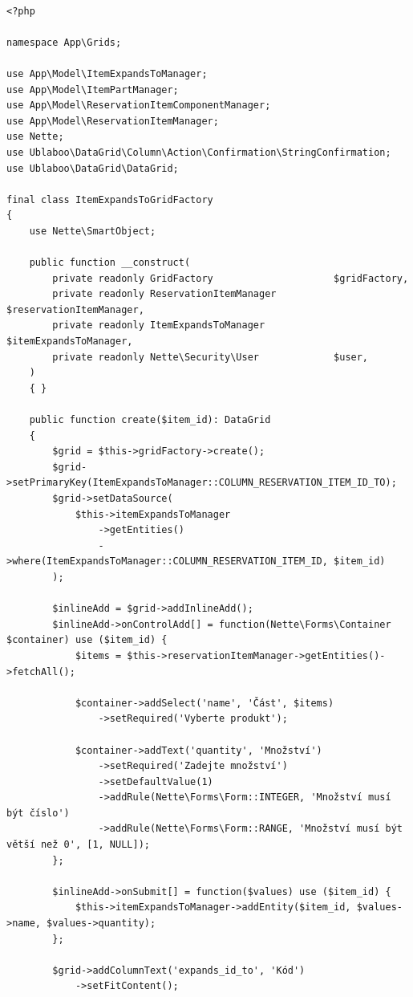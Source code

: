 \begin{lstlisting}[label=src:GenerateStockTakingDocumentFormFactory,caption={Továrna editovatelné tabulky pro správu vazeb produktů}]

<?php

namespace App\Grids;

use App\Model\ItemExpandsToManager;
use App\Model\ItemPartManager;
use App\Model\ReservationItemComponentManager;
use App\Model\ReservationItemManager;
use Nette;
use Ublaboo\DataGrid\Column\Action\Confirmation\StringConfirmation;
use Ublaboo\DataGrid\DataGrid;

final class ItemExpandsToGridFactory
{
    use Nette\SmartObject;

    public function __construct(
        private readonly GridFactory                     $gridFactory,
        private readonly ReservationItemManager          $reservationItemManager,
        private readonly ItemExpandsToManager            $itemExpandsToManager,
        private readonly Nette\Security\User             $user,
    )
    { }

    public function create($item_id): DataGrid
    {
        $grid = $this->gridFactory->create();
        $grid->setPrimaryKey(ItemExpandsToManager::COLUMN_RESERVATION_ITEM_ID_TO);
        $grid->setDataSource(
            $this->itemExpandsToManager
                ->getEntities()
                ->where(ItemExpandsToManager::COLUMN_RESERVATION_ITEM_ID, $item_id)
        );

        $inlineAdd = $grid->addInlineAdd();
        $inlineAdd->onControlAdd[] = function(Nette\Forms\Container $container) use ($item_id) {
            $items = $this->reservationItemManager->getEntities()->fetchAll();
            
            $container->addSelect('name', 'Část', $items)
                ->setRequired('Vyberte produkt');

            $container->addText('quantity', 'Množství')
                ->setRequired('Zadejte množství')
                ->setDefaultValue(1)
                ->addRule(Nette\Forms\Form::INTEGER, 'Množství musí být číslo')
                ->addRule(Nette\Forms\Form::RANGE, 'Množství musí být větší než 0', [1, NULL]);
        };

        $inlineAdd->onSubmit[] = function($values) use ($item_id) {
            $this->itemExpandsToManager->addEntity($item_id, $values->name, $values->quantity);
        };

        $grid->addColumnText('expands_id_to', 'Kód')
            ->setFitContent();


\end{lstlisting}
